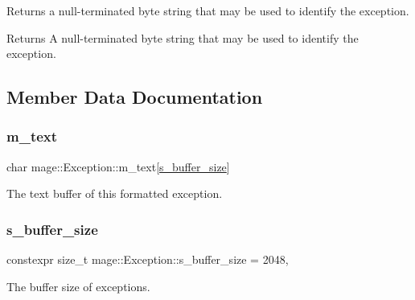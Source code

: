 Returns a null-\/terminated byte string that may be used to identify the exception.

\begin{DoxyReturn}{Returns}
A null-\/terminated byte string that may be used to identify the exception. 
\end{DoxyReturn}


\subsection{Member Data Documentation}
\hypertarget{classmage_1_1_exception_ad5bd9bb044bebaa1bac36c8c8a25c052}{}\label{classmage_1_1_exception_ad5bd9bb044bebaa1bac36c8c8a25c052} 
\subsubsection{\texorpdfstring{m\+\_\+text}{m\_text}}
{\footnotesize\ttfamily char mage\+::\+Exception\+::m\+\_\+text\mbox{[}\hyperlink{classmage_1_1_exception_a41c9eb8e4a238210822170dfa211e493}{s\+\_\+buffer\+\_\+size}\mbox{]}\hspace{0.3cm}{\ttfamily [private]}}

The text buffer of this formatted exception. \hypertarget{classmage_1_1_exception_a41c9eb8e4a238210822170dfa211e493}{}\label{classmage_1_1_exception_a41c9eb8e4a238210822170dfa211e493} 
\subsubsection{\texorpdfstring{s\+\_\+buffer\+\_\+size}{s\_buffer\_size}}
{\footnotesize\ttfamily constexpr size\+\_\+t mage\+::\+Exception\+::s\+\_\+buffer\+\_\+size = 2048\hspace{0.3cm}{\ttfamily [static]}, {\ttfamily [private]}}

The buffer size of exceptions. 